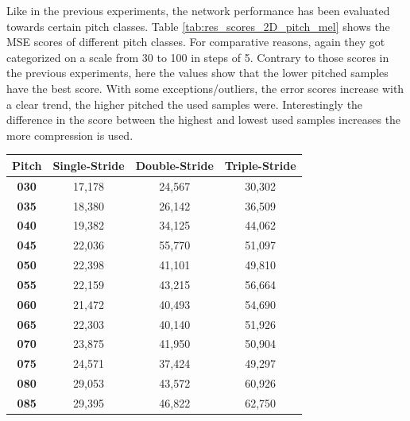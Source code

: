 Like in the previous experiments, the network performance has been evaluated towards certain pitch classes. Table \ref{tab:res_scores_2D_pitch_mel} shows the MSE scores of different pitch classes. For comparative reasons, again they got categorized on a scale from 30 to 100 in steps of 5. Contrary to those scores in the previous experiments, here the values show that the lower pitched samples have the best score. With some exceptions/outliers, the error scores increase with a clear trend, the higher pitched the used samples were. Interestingly the difference in the score between the highest and lowest used samples increases the more compression is used. 

\begin{table}[htb!]
\centering
\captionsetup{justification=centering}
\begin{tabular}{|c|c|c|c|}
\hline
\textbf{Pitch} & \textbf{Single-Stride} & \textbf{Double-Stride} & \textbf{Triple-Stride} \\ \hline
\textbf{030}   & 17,178                 & 24,567                 & 30,302                 \\ \hline
\textbf{035}   & 18,380                 & 26,142                 & 36,509                 \\ \hline
\textbf{040}   & 19,382                 & 34,125                 & 44,062                 \\ \hline
\textbf{045}   & 22,036                 & 55,770                 & 51,097                 \\ \hline
\textbf{050}   & 22,398                 & 41,101                 & 49,810                 \\ \hline
\textbf{055}   & 22,159                 & 43,215                 & 56,664                 \\ \hline
\textbf{060}   & 21,472                 & 40,493                 & 54,690                 \\ \hline
\textbf{065}   & 22,303                 & 40,140                 & 51,926                 \\ \hline
\textbf{070}   & 23,875                 & 41,950                 & 50,904                 \\ \hline
\textbf{075}   & 24,571                 & 37,424                 & 49,297                 \\ \hline
\textbf{080}   & 29,053                 & 43,572                 & 60,926                 \\ \hline
\textbf{085}   & 29,395                 & 46,822                 & 62,750                 \\ \hline

\end{tabular}
\end{table}
